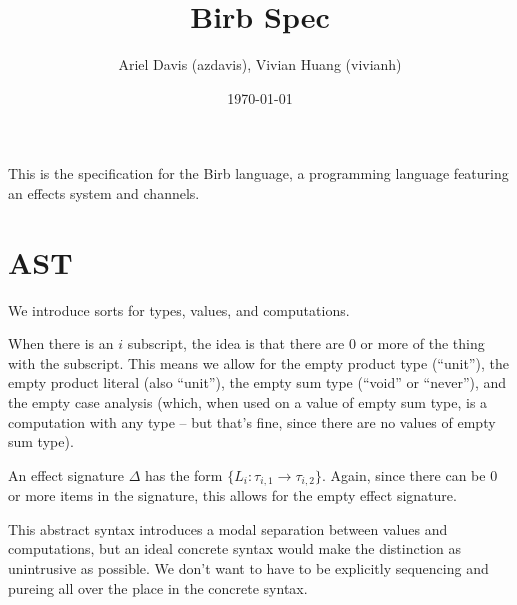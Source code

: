\documentclass[12pt]{article}
\title{Birb Spec}
\author{Ariel Davis (azdavis), Vivian Huang (vivianh)}
\date{\today}
\begin{document}
\maketitle

This is the specification for the Birb language, a programming language
featuring an effects system and channels.

\newpage
\section{AST}

We introduce sorts for types, values, and computations.

When there is an $i$ subscript, the idea is that there are 0 or more of the
thing with the subscript. This means we allow for the empty product type
(``unit''), the empty product literal (also ``unit''), the empty sum type
(``void'' or ``never''), and the empty case analysis (which, when used on a
value of empty sum type, is a computation with any type -- but that's fine,
since there are no values of empty sum type).

An effect signature $\Delta$ has the form $\{ L_i : \tau_{i,1} \rightarrow
\tau_{i,2} \}$. Again, since there can be 0 or more items in the signature, this
allows for the empty effect signature.

This abstract syntax introduces a modal separation between values and
computations, but an ideal concrete syntax would make the distinction as
unintrusive as possible. We don't want to have to be explicitly sequencing and
\textsf{pure}ing all over the place in the concrete syntax.
\end{document}
